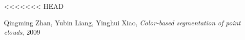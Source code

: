\documentclass[12pt,titlepage,french]{article}
\begin{document}

<<<<<<< HEAD
\begin{thebibliography}{3}

 Qingming Zhan, Yubin Liang, Yinghui Xiao, \textit{Color-based segmentation of point clouds}, 2009
\end{thebibliography}
\end{document}
